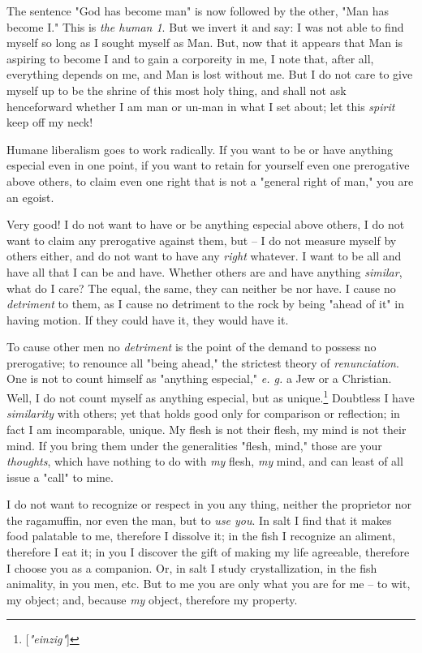 \documentclass[a4paper]{book}
\begin{document}
The sentence "{}God has become man"{} is now followed by the other, "{}Man has 
become I."{} This is \textit{the human 1}. But we invert it and say: I was not 
able to find myself so long as I sought myself as Man. But, now that it 
appears that Man is aspiring to become I and to gain a corporeity in me, I 
note that, after all, everything depends on me, and Man is lost without me. 
But I do not care to give myself up to be the shrine of this most holy thing, 
and shall not ask henceforward whether I am man or un-man in what I set about; 
let this \textit{spirit} keep off my neck!

Humane liberalism goes to work radically. If you want to be or have anything 
especial even in one point, if you want to retain for yourself even one 
prerogative above others, to claim even one right that is not a "{}general 
right of man,"{} you are an egoist.

Very good! I do not want to have or be anything especial above others, I do 
not want to claim any prerogative against them, but -- I do not measure myself 
by others either, and do not want to have any \textit{right} whatever. I want 
to be all and have all that I can be and have. Whether others are and have 
anything \textit{similar}, what do I care? The equal, the same, they can 
neither be nor have. I cause no \textit{detriment} to them, as I cause no 
detriment to the rock by being "{}ahead of it"{} in having motion. If they 
could have it, they would have it.

To cause other men no \textit{detriment} is the point of the demand to possess 
no prerogative; to renounce all "{}being ahead,"{} the strictest theory of 
\textit{renunciation}. One is not to count himself as "{}anything especial,"{} 
\textit{e. g.} a Jew or a Christian. Well, I do not count myself as anything 
especial, but as unique.\footnote{[\textit{"{}einzig"{}}]} Doubtless I have 
\textit{similarity} with others; yet that holds good only for comparison or 
reflection; in fact I am incomparable, unique. My flesh is not their flesh, my 
mind is not their mind. If you bring them under the generalities "{}flesh, 
mind,"{} those are your \textit{thoughts}, which have nothing to do with 
\textit{my} flesh, \textit{my} mind, and can least of all issue a "{}call"{} 
to mine.

I do not want to recognize or respect in you any thing, neither the proprietor 
nor the ragamuffin, nor even the man, but to \textit{use you}. In salt I find 
that it makes food palatable to me, therefore I dissolve it; in the fish I 
recognize an aliment, therefore I eat it; in you I discover the gift of making 
my life agreeable, therefore I choose you as a companion. Or, in salt I study 
crystallization, in the fish animality, in you men, etc. But to me you are 
only what you are for me -- to wit, my object; and, because \textit{my} 
object, therefore my property.
\end{document}
